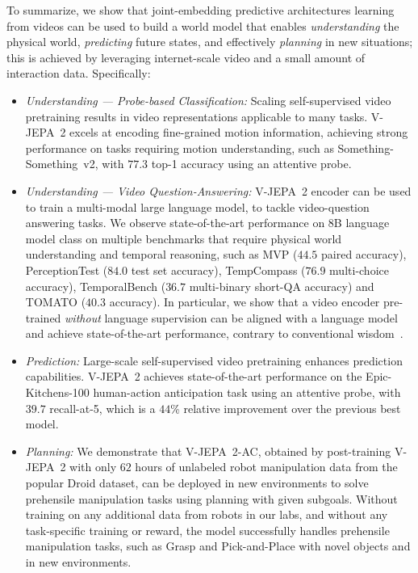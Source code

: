 \documentclass[]{kling/kling}
\newcommand{\model}{V-JEPA~2\xspace}
\newcommand{\acModel}{V-JEPA~2-AC\xspace}
\begin{document}
To summarize, we show that joint-embedding predictive architectures learning from videos can be used to build a world model that enables \emph{understanding} the physical world, \emph{predicting} future states, and effectively \emph{planning} in new situations; this is achieved by leveraging internet-scale video and a small amount of interaction data.
Specifically:
\begin{itemize}


\item \textit{Understanding --- Probe-based Classification:} Scaling self-supervised video pretraining results in video representations applicable to many tasks. \model excels at encoding fine-grained motion information, achieving strong performance on tasks requiring motion understanding, such as Something-Something~v2, with $77.3$ top-1 accuracy using an attentive probe.


\item \textit{Understanding --- Video Question-Answering:} \model encoder can be used to train a multi-modal large language model, to tackle video-question answering tasks. We observe state-of-the-art performance on 8B language model class on multiple benchmarks that require physical world understanding and temporal reasoning, such as MVP ($44.5$ paired accuracy), PerceptionTest ($84.0$ test set accuracy), TempCompass ($76.9$ multi-choice accuracy), TemporalBench ($36.7$ multi-binary short-QA accuracy) and TOMATO ($40.3$ accuracy).  In particular, we show that a video encoder pre-trained \textit{without} language supervision can be aligned with a language model and achieve state-of-the-art performance, contrary to conventional wisdom~\citep{yuan2025tarsier2, wang2024internvideo2}.

\item \textit{Prediction:} Large-scale self-supervised video pretraining enhances prediction capabilities.  \model achieves state-of-the-art performance on the Epic-Kitchens-100 human-action anticipation task using an attentive probe, with $39.7$ recall-at-5, which is a $44$\% relative improvement over the previous best model.

\item \textit{Planning:} We demonstrate that \acModel, obtained by post-training \model with only $62$ hours of unlabeled robot manipulation data from the popular Droid dataset, can be deployed in new environments to solve prehensile manipulation tasks using planning with given subgoals.
Without training on any additional data from robots in our labs, and without any task-specific training or reward, the model successfully handles prehensile manipulation tasks, such as Grasp and Pick-and-Place with novel objects and in new environments.
\end{itemize}
\end{document}
